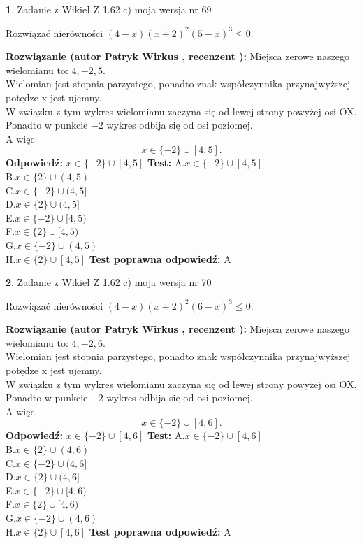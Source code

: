 \documentclass[12pt, a4paper]{article}
\theoremstyle{definition} %
\newtheorem{zad}{}
\newcommand{\zadStart}[1]{\begin{zad}#1\newline}
\newcommand{\zadStop}{\end{zad}}
\newcommand{\rozwStart}[2]{\noindent \textbf{Rozwiązanie (autor #1 , recenzent #2): }\newline}
\newcommand{\rozwStop}{\newline}
\newcommand{\odpStart}{\noindent \textbf{Odpowiedź:}\newline}
\newcommand{\odpStop}{\newline}
\newcommand{\testStart}{\noindent \textbf{Test:}\newline}
\newcommand{\testStop}{\newline}
\newcommand{\kluczStart}{\noindent \textbf{Test poprawna odpowiedź:}\newline}
\newcommand{\kluczStop}{\newline}
\begin{document}
\zadStart{Zadanie z Wikieł Z 1.62 c) moja wersja nr 69}

Rozwiązać nierówności $(4-x)(x+2)^{2}(5-x)^{3}\le0$.
\zadStop
\rozwStart{Patryk Wirkus}{}
Miejsca zerowe naszego wielomianu to: $4, -2, 5$.\\
Wielomian jest stopnia parzystego, ponadto znak współczynnika przy\linebreak najwyższej potędze x jest ujemny.\\ W związku z tym wykres wielomianu zaczyna się od lewej strony powyżej osi OX.\\
Ponadto w punkcie $-2$ wykres odbija się od osi poziomej.\\
A więc $$x \in \{-2\} \cup [4,5].$$
\rozwStop
\odpStart
$x \in \{-2\} \cup [4,5]$
\odpStop
\testStart
A.$x \in \{-2\} \cup [4,5]$\\
B.$x \in \{2\} \cup (4,5)$\\
C.$x \in \{-2\} \cup (4,5]$\\
D.$x \in \{2\} \cup (4,5]$\\
E.$x \in \{-2\} \cup [4,5)$\\
F.$x \in \{2\} \cup [4,5)$\\
G.$x \in \{-2\} \cup (4,5)$\\
H.$x \in \{2\} \cup [4,5]$
\testStop
\kluczStart
A
\kluczStop



\zadStart{Zadanie z Wikieł Z 1.62 c) moja wersja nr 70}

Rozwiązać nierówności $(4-x)(x+2)^{2}(6-x)^{3}\le0$.
\zadStop
\rozwStart{Patryk Wirkus}{}
Miejsca zerowe naszego wielomianu to: $4, -2, 6$.\\
Wielomian jest stopnia parzystego, ponadto znak współczynnika przy\linebreak najwyższej potędze x jest ujemny.\\ W związku z tym wykres wielomianu zaczyna się od lewej strony powyżej osi OX.\\
Ponadto w punkcie $-2$ wykres odbija się od osi poziomej.\\
A więc $$x \in \{-2\} \cup [4,6].$$
\rozwStop
\odpStart
$x \in \{-2\} \cup [4,6]$
\odpStop
\testStart
A.$x \in \{-2\} \cup [4,6]$\\
B.$x \in \{2\} \cup (4,6)$\\
C.$x \in \{-2\} \cup (4,6]$\\
D.$x \in \{2\} \cup (4,6]$\\
E.$x \in \{-2\} \cup [4,6)$\\
F.$x \in \{2\} \cup [4,6)$\\
G.$x \in \{-2\} \cup (4,6)$\\
H.$x \in \{2\} \cup [4,6]$
\testStop
\kluczStart
A
\kluczStop
\end{document}
